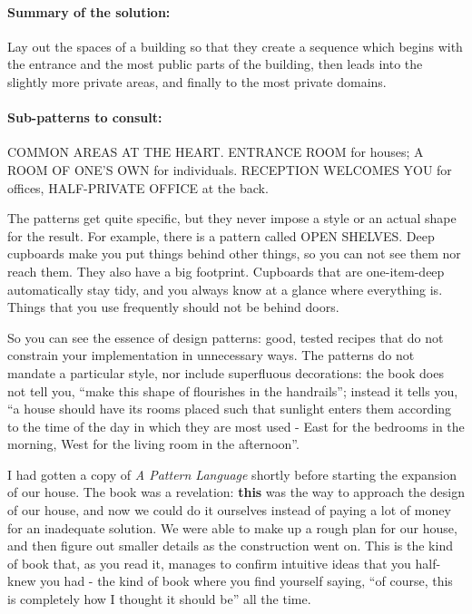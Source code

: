 \paragraph*{Summary of the solution:}
Lay out the spaces of a building so that they create a sequence which begins with the entrance and the most public parts of the building, then leads into the slightly more private areas, and finally to the most private domains.

\paragraph*{Sub-patterns to consult:} COMMON AREAS AT THE HEART. ENTRANCE ROOM for houses; A ROOM OF ONE'S OWN for individuals.  RECEPTION WELCOMES YOU for offices, HALF-PRIVATE OFFICE at the back.

The patterns get quite specific, but they never impose a style or an actual shape for the result. For example, there is a pattern called OPEN SHELVES. Deep cupboards make you put things behind other things, so you can not see them nor reach them. They also have a big footprint. Cupboards that are one-item-deep automatically stay tidy, and you always know at a glance where everything is. Things that you use frequently should not be behind doors.

So you can see the essence of design patterns: good, tested recipes that do not constrain your implementation in unnecessary ways.  The patterns do not mandate a particular style, nor include superfluous decorations: the book does not tell you, ``make this shape of flourishes in the handrails''; instead it tells you, ``a house should have its rooms placed such that sunlight enters them according to the time of the day in which they are most used - East for the bedrooms in the morning, West for the living room in the afternoon''.

I had gotten a copy of \textit{A Pattern Language} shortly before starting the expansion of our house. The book was a revelation:  \textbf{this} was the way to approach the design of our house, and now we could do it ourselves instead of paying a lot of money for an inadequate solution. We were able to make up a rough plan for our house, and then figure out smaller details as the construction went on. This is the kind of book that, as you read it, manages to confirm intuitive ideas that you half-knew you had - the kind of book where you find yourself saying, ``of course, this is completely how I thought it should be'' all the time.

